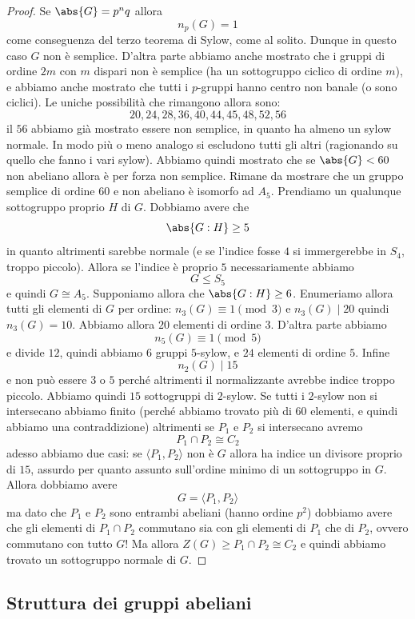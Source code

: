 \documentclass[11pt]{scrartcl}
\begin{document}
	\begin{proof}
		Se $\abs{G}=p^nq$ allora 
		$$n_p(G)=1$$
		come conseguenza del terzo teorema di Sylow, come al solito. Dunque in questo caso $G$ non è semplice. D'altra parte abbiamo anche mostrato che i gruppi di ordine $2m$ con $m$ dispari non è semplice (ha un sottogruppo ciclico di ordine $m$), e abbiamo anche mostrato che tutti i $p$-gruppi hanno centro non banale (o sono ciclici). Le uniche possibilità che rimangono allora sono:
		$$20,24,28,36,40,44,45,48,52,56$$
		il $56$ abbiamo già mostrato essere non semplice, in quanto ha almeno un sylow normale. In modo più o meno analogo si escludono tutti gli altri (ragionando su quello che fanno i vari sylow). Abbiamo quindi mostrato che se $\abs{G}<60$ non abeliano allora è per forza non semplice. Rimane da mostrare che un gruppo semplice di ordine $60$ e non abeliano è isomorfo ad $A_5$. Prendiamo un qualunque sottogruppo proprio $H$ di $G$. Dobbiamo avere che 
		$$\abs{G:H}\ge 5$$
		in quanto altrimenti sarebbe normale (e se l'indice fosse $4$ si immergerebbe in $S_4$, troppo piccolo). Allora se l'indice è proprio $5$ necessariamente abbiamo
		$$G\le S_5$$
		e quindi $G\cong A_5$. Supponiamo allora che $\abs{G:H}\ge 6$. Enumeriamo allora tutti gli elementi di $G$ per ordine:
		$n_3(G)\equiv 1 \pmod{3}$
		e $n_3(G)\mid 20$ quindi $n_3(G)=10$. Abbiamo allora $20$ elementi di ordine $3$. D'altra parte abbiamo
		$$n_5(G)\equiv 1 \pmod{5}$$
		e divide $12$, quindi abbiamo $6$ gruppi $5$-sylow, e $24$ elementi di ordine $5$. Infine
		$$n_2(G)\mid 15$$
		e non può essere $3$ o $5$ perché altrimenti il normalizzante avrebbe indice troppo piccolo. Abbiamo quindi $15$ sottogruppi di $2$-sylow. Se tutti i $2$-sylow non si intersecano abbiamo finito (perché abbiamo trovato più di $60$ elementi, e quindi abbiamo una contraddizione) altrimenti se $P_1$ e $P_2$ si intersecano avremo
		$$P_1\cap P_2\cong C_2$$
		adesso abbiamo due casi: se $\langle P_1,P_2\rangle$ non è $G$ allora ha indice un divisore proprio di $15$, assurdo per quanto assunto sull'ordine minimo di un sottogruppo in $G$. Allora dobbiamo avere
		$$G=\langle P_1,P_2\rangle$$
		ma dato che $P_1$ e $P_2$ sono entrambi abeliani (hanno ordine $p^2$) dobbiamo avere che gli elementi di $P_1\cap P_2$ commutano sia con gli elementi di $P_1$ che di $P_2$, ovvero commutano con tutto $G$! Ma allora $Z(G)\ge P_1\cap P_2\cong C_2$ e quindi abbiamo trovato un sottogruppo normale di $G$.
	\end{proof}
	
	
	\subsection{Struttura dei gruppi abeliani}
	
\end{document}
